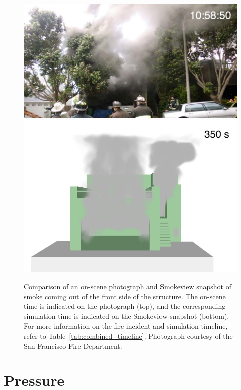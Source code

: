 \documentclass[12pt,oneside]{book}
\begin{document}
\begin{figure}[!ht]
\includegraphics[width=5.0in]{../Figures/Photo_Front_350_s}
\includegraphics[width=5.0in]{../Figures/SMV_Front_350_s}
\caption[Snapshot of smoke coming out of the front side of the structure.]
{Comparison of an on-scene photograph and Smokeview snapshot of smoke coming out of the front side of the structure. The on-scene time is indicated on the photograph (top), and the corresponding simulation time is indicated on the Smokeview snapshot (bottom). For more information on the fire incident and simulation timeline, refer to Table~\ref{tab:combined_timeline}. Photograph courtesy of the San Francisco Fire Department.}
\label{fig:timeline_comparison_front}
\end{figure}


\clearpage


\section{Pressure}
\label{sec:pressure}
\end{document}
